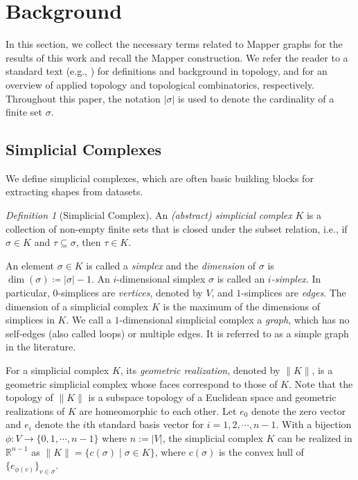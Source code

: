 \documentclass[reqno,oneside,11pt]{amsart}
\theoremstyle{definition}
\theoremstyle{remark}
\newtheorem{definition}[theorem]{Definition}
\begin{document}
\section{Background}
\label{sec:background}

In this section, we collect the necessary terms related to Mapper graphs for the results of this work and recall the Mapper construction. We refer the reader to a standard text (e.g., \cite{MunkresTopology00}) for definitions and background in topology, and \cite{carlsson2021topological,matouvsek2003using} for an overview of applied topology and topological combinatorics, respectively. Throughout this paper, the notation $|\sigma|$ is used to denote the cardinality of a finite set $\sigma$.

\subsection{Simplicial Complexes}
We define simplicial complexes, which are often basic building blocks for extracting shapes from datasets. 

\begin{definition}[Simplicial Complex]
An \emph{(abstract) simplicial complex} $K$ is a collection of non-empty finite sets that is closed under the subset relation, i.e., if $\sigma \in K$ and $\tau\subseteq \sigma$, then $\tau \in K$. 
\end{definition}

An element $\sigma \in K$ is called a \emph{simplex} and the \emph{dimension} of $\sigma$ is $\dim(\sigma) \coloneq |\sigma|-1$. An $i$-dimensional simplex $\sigma$ is called an \emph{$i$-simplex}. In particular, $0$-simplices are \emph{vertices}, denoted by $V$, and $1$-simplices are \emph{edges}. The dimension of a simplicial complex $K$ is the maximum of the dimensions of simplices in $K$. We call a $1$-dimensional simplicial complex a \emph{graph}, which has no self-edges (also called loops) or multiple edges. It is referred to as a simple graph in the literature.

For a simplicial complex $K$, its \emph{geometric realization}, denoted by $\|K\|$, is a geometric simplicial complex whose faces correspond to those of $K$. Note that the topology of $\|K\|$ is a subspace topology of a Euclidean space and geometric realizations of $K$ are homeomorphic to each other. Let $e_0$ denote the zero vector and $e_i$ denote the $i$th standard basis vector for $i=1,2,\cdots,n-1$. With a bijection $\phi:V \to \{0,1, \cdots, n-1\}$ where $n:=|V|$, the simplicial complex $K$ can be realized in $\mathbb{R}^{n-1}$ as $\|K\|=\{c(\sigma) \mid \sigma \in K \}$, where $c(\sigma)$ is the convex hull of $\{e_{\phi(v)}\}_{v \in \sigma}$.
\end{document}
